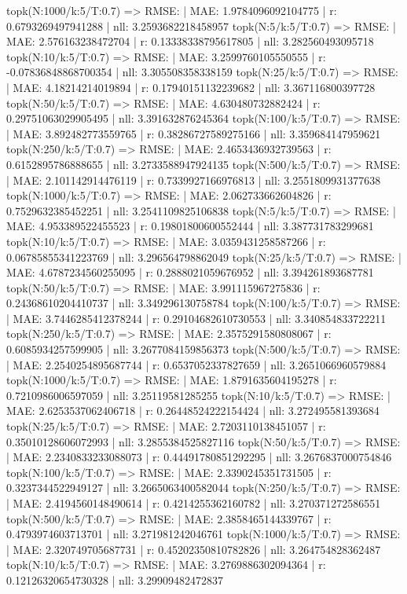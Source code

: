 topk(N:1000/k:5/T:0.7) => RMSE: | MAE: 1.9784096092104775 | r: 0.6793269497941288 | nll: 3.2593682218458957
topk(N:5/k:5/T:0.7) => RMSE: | MAE: 2.576163238472704 | r: 0.13338338795617805 | nll: 3.282560493095718
topk(N:10/k:5/T:0.7) => RMSE: | MAE: 3.2599760105550555 | r: -0.07836848868700354 | nll: 3.305508358338159
topk(N:25/k:5/T:0.7) => RMSE: | MAE: 4.18214214019894 | r: 0.17940151132239682 | nll: 3.367116800397728
topk(N:50/k:5/T:0.7) => RMSE: | MAE: 4.630480732882424 | r: 0.29751063029905495 | nll: 3.391632876245364
topk(N:100/k:5/T:0.7) => RMSE: | MAE: 3.892482773559765 | r: 0.38286727589275166 | nll: 3.359684147959621
topk(N:250/k:5/T:0.7) => RMSE: | MAE: 2.4653436932739563 | r: 0.6152895786888655 | nll: 3.2733588947924135
topk(N:500/k:5/T:0.7) => RMSE: | MAE: 2.101142914476119 | r: 0.7339927166976813 | nll: 3.2551809931377638
topk(N:1000/k:5/T:0.7) => RMSE: | MAE: 2.062733662604826 | r: 0.7529632385452251 | nll: 3.2541109825106838
topk(N:5/k:5/T:0.7) => RMSE: | MAE: 4.953389522455523 | r: 0.19801800600552444 | nll: 3.387731783299681
topk(N:10/k:5/T:0.7) => RMSE: | MAE: 3.0359431258587266 | r: 0.06785855341223769 | nll: 3.296564798862049
topk(N:25/k:5/T:0.7) => RMSE: | MAE: 4.6787234560255095 | r: 0.2888021059676952 | nll: 3.394261893687781
topk(N:50/k:5/T:0.7) => RMSE: | MAE: 3.991115967275836 | r: 0.24368610204410737 | nll: 3.349296130758784
topk(N:100/k:5/T:0.7) => RMSE: | MAE: 3.7446285412378244 | r: 0.29104682610730553 | nll: 3.340854833722211
topk(N:250/k:5/T:0.7) => RMSE: | MAE: 2.3575291580808067 | r: 0.6085934257599905 | nll: 3.2677084159856373
topk(N:500/k:5/T:0.7) => RMSE: | MAE: 2.2540254895687744 | r: 0.6537052337827659 | nll: 3.2651066960579884
topk(N:1000/k:5/T:0.7) => RMSE: | MAE: 1.8791635604195278 | r: 0.7210986006597059 | nll: 3.25119581285255
topk(N:10/k:5/T:0.7) => RMSE: | MAE: 2.6253537062406718 | r: 0.26448524222154424 | nll: 3.272495581393684
topk(N:25/k:5/T:0.7) => RMSE: | MAE: 2.7203110138451057 | r: 0.35010128606072993 | nll: 3.2855384525827116
topk(N:50/k:5/T:0.7) => RMSE: | MAE: 2.2340833233088073 | r: 0.44491780851292295 | nll: 3.2676837000754846
topk(N:100/k:5/T:0.7) => RMSE: | MAE: 2.3390245351731505 | r: 0.3237344522949127 | nll: 3.2665063400582044
topk(N:250/k:5/T:0.7) => RMSE: | MAE: 2.4194560148490614 | r: 0.4214255362160782 | nll: 3.270371272586551
topk(N:500/k:5/T:0.7) => RMSE: | MAE: 2.3858465144339767 | r: 0.4793974603713701 | nll: 3.271981242046761
topk(N:1000/k:5/T:0.7) => RMSE: | MAE: 2.320749705687731 | r: 0.45202350810782826 | nll: 3.264754828362487
topk(N:10/k:5/T:0.7) => RMSE: | MAE: 3.2769886302094364 | r: 0.12126320654730328 | nll: 3.29909482472837
